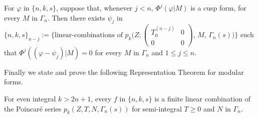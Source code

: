 \begin{sublemma}\label{c1:lem-1.6.8}
For $\varphi$ in $\{n,k,s\}$, suppose that, whenever $j<n$,
$\Phi^{j}(\varphi|M)$ is a cusp form, for every $M$ in
$\Gamma_{n}$. Then there exists $\psi_{j}$ in
$\{n,k,s\}_{n-j}:=\{\text{linear-combinations of \ }
p_{k}(Z;\left(\begin{smallmatrix} T^{(n-j)}_{0} & 0\\ 0 & 0
\end{smallmatrix}\right)$, $M$, $\Gamma_{n}(s))\}$ such that
$\Phi^{j}((\varphi-\psi_{j})|M)=0$ for every $M$ in $\Gamma_{n}$ and
$1\leq j\leq n$.
\end{sublemma}

Finally we state and prove the following Representation Theorem for
modular forms.

\setcounter{subtheorem}{8}
\begin{subtheorem}\label{c1:thm-1.6.9}
For even integral $k>2n+1$, every $f$ in $\{n,k,s\}$ is a finite
linear combination of the Poincar\'e series
$p_{k}(Z,T,N,\Gamma_{n}(s))$ for semi-integral $T\geq 0$ and $N$ in
$\Gamma_{n}$. 
\end{subtheorem}

